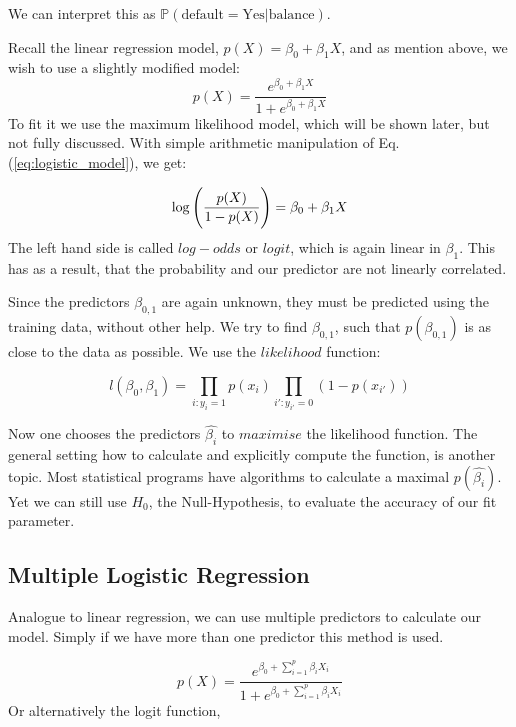 \documentclass{article}
\begin{document}
We can interpret this as $\mathbb{P}(\text{default}=\text{Yes}|\text{balance})$. \par

Recall the linear regression model, $p(X)=\beta_0+\beta_1X$, and as mention above, we wish to use a slightly modified model: 
\begin{equation}\label{eq:logistic_model}
    p(X) = \frac{e^{\beta_0+\beta_1X}}{1+e^{\beta_0+\beta_1X}}
\end{equation}
To fit it we use the maximum likelihood model, which will be shown later, but not fully discussed. With simple arithmetic manipulation of Eq.(\ref{eq:logistic_model}), we get:

\begin{equation}
  \log \Bigg{(} \frac{p(X)}{1-p(X)} \Bigg{)} =\beta_0+\beta_1X
\end{equation}
The left hand side is called $log-odds$ or $logit$, which is again linear in $\beta_1$. This has as a result, that the probability and our predictor are not linearly correlated.

Since the predictors $\beta_{0,1}$ are again unknown, they must be predicted using the training data, without other help. We try to find $\beta_{0,1}$, such that $p(\beta_{0,1})$ is as close to the data as possible. We use the $likelihood$ function:

\begin{equation}
    l(\beta_0,\beta_1)= \prod_{i:y_{i}=1}p(x_{i}) \prod_{i':y_{i'}=0}(1-p(x_{i'}))
\end{equation}

Now one chooses the predictors $\hat{\beta_i}$ to $maximise$ the likelihood function. The general setting how to calculate and explicitly compute the function, is another topic. Most statistical programs have algorithms to calculate a maximal $p(\hat{\beta_i})$. Yet we can still use $H_0$, the Null-Hypothesis, to evaluate the accuracy of our fit parameter.

\subsection{Multiple Logistic Regression}
Analogue to linear regression, we can use multiple predictors to calculate our model. Simply if we have more than one predictor this method is used. 

\begin{equation}
    p(X)=\frac{e^{\beta_0 + \sum_{i=1}^{p}\beta_{i}X_{i}}}{1+e^{\beta_0 + \sum_{i=1}^{p}\beta_{i}X_{i}}}
\end{equation}
Or alternatively the logit function,
\end{document}
